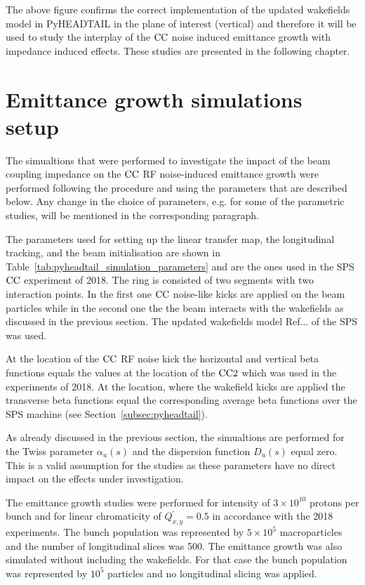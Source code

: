  The above figure confirms the correct implementation of the updated wakefields model in PyHEADTAIL in the plane of interest (vertical) and therefore it will be used to study the interplay of the ${\mathrm{CC}}$ noise induced emittance growth with impedance induced effects. These studies are presented in the following chapter.

\section{Emittance growth simulations setup}\label{sec:setup_simulations_emit_growth}
The simualtions that were performed to investigate the impact of the beam coupling impedance on the ${\mathrm{CC}}$ RF noise-induced emittance growth were performed following the procedure and using the parameters that are described below. Any change in the choice of parameters, e.g. for some of the parametric studies, will be mentioned in the corresponding paragraph.

The parameters used for setting up the linear transfer map, the longitudinal tracking, and the beam initialisation are shown in Table~\ref{tab:pyheadtail_simulation_parameters} and are the ones used in the SPS ${\mathrm{CC}}$ experiment of 2018. The ring is consisted of two segments with two interaction points. In the first one ${\mathrm{CC}}$ noise-like kicks are applied on the beam particles while in the second one the the beam interacts with the wakefields as discussed in the previous section. The updated wakefields model Ref... of the SPS was used.

At the location of the ${\mathrm{CC}}$ RF noise kick the horizontal and vertical beta functions equals the values at the location of the ${\mathrm{CC}}2$ which was used in the experiments of 2018. At the location, where the wakefield kicks are applied the transverse beta functions equal the corresponding average beta functions over the SPS machine (see Section~\ref{subsec:pyheadtail}). 

As already discussed in the previous section, the simualtions are performed for the Twiss parameter $\alpha_u(s)$ and the dispersion function $D_u(s)$ equal zero. This is a valid assumption for the studies as these parameters have no direct impact on the effects under investigation.

The emittance growth studies were performed for intensity of $3 \times 10^{10}$ protons per bunch and for linear chromaticity of $Q^{\prime}_{x,y}=0.5$ in accordance with the 2018 experiments. The bunch population was represented by $5 \times 10^{5}$ macroparticles and the number of longitudinal slices was 500. The emittance growth was also simulated without including the wakefields. For that case the bunch population was represented by $10^{5}$ particles and no longitudinal slicing was applied.

